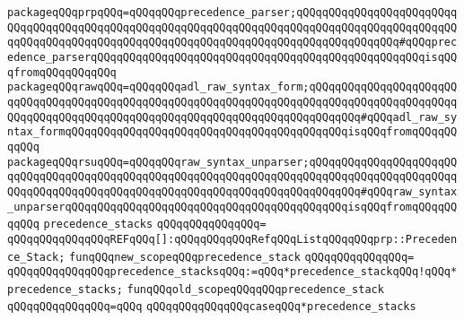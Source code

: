 \verb|packageqQQqprpqQQq=qQQqqQQqprecedence_parser;qQQqqQQqqQQqqQQqqQQqqQQqqQQqqQQqqQQqqQQqqQQqqQQqqQQqqQQqqQQqqQQqqQQqqQQqqQQqqQQqqQQqqQQqqQQqqQQqqQQqqQQqqQQqqQQqqQQqqQQqqQQqqQQqqQQqqQQqqQQqqQQqqQQqqQQqqQQq#qQQqprecedence_parserqQQqqQQqqQQqqQQqqQQqqQQqqQQqqQQqqQQqqQQqqQQqqQQqqQQqisqQQqfromqQQqqQQqqQQq|\newline
\verb|packageqQQqrawqQQq=qQQqqQQqadl_raw_syntax_form;qQQqqQQqqQQqqQQqqQQqqQQqqQQqqQQqqQQqqQQqqQQqqQQqqQQqqQQqqQQqqQQqqQQqqQQqqQQqqQQqqQQqqQQqqQQqqQQqqQQqqQQqqQQqqQQqqQQqqQQqqQQqqQQqqQQqqQQqqQQqqQQqqQQq#qQQqadl_raw_syntax_formqQQqqQQqqQQqqQQqqQQqqQQqqQQqqQQqqQQqqQQqqQQqisqQQqfromqQQqqQQqqQQq|\newline
\verb|packageqQQqrsuqQQq=qQQqqQQqraw_syntax_unparser;qQQqqQQqqQQqqQQqqQQqqQQqqQQqqQQqqQQqqQQqqQQqqQQqqQQqqQQqqQQqqQQqqQQqqQQqqQQqqQQqqQQqqQQqqQQqqQQqqQQqqQQqqQQqqQQqqQQqqQQqqQQqqQQqqQQqqQQqqQQqqQQqqQQq#qQQqraw_syntax_unparserqQQqqQQqqQQqqQQqqQQqqQQqqQQqqQQqqQQqqQQqqQQqisqQQqfromqQQqqQQqqQQq|\newline
\newline
\newline
\verb|precedence_stacks|\newline
\verb|qQQqqQQqqQQqqQQq=|\newline
\verb|qQQqqQQqqQQqqQQqREFqQQq[]:qQQqqQQqqQQqRefqQQqListqQQqqQQqprp::Precedence_Stack;|\newline
\newline
\newline
\verb|funqQQqnew_scopeqQQqprecedence_stack|\newline
\verb|qQQqqQQqqQQqqQQq=|\newline
\verb|qQQqqQQqqQQqqQQqprecedence_stacksqQQq:=qQQq*precedence_stackqQQq!qQQq*precedence_stacks;|\newline
\newline
\newline
\verb|funqQQqold_scopeqQQqqQQqprecedence_stack|\newline
\verb|qQQqqQQqqQQqqQQq=qQQq|\newline
\verb|qQQqqQQqqQQqqQQqcaseqQQq*precedence_stacks|\newline
